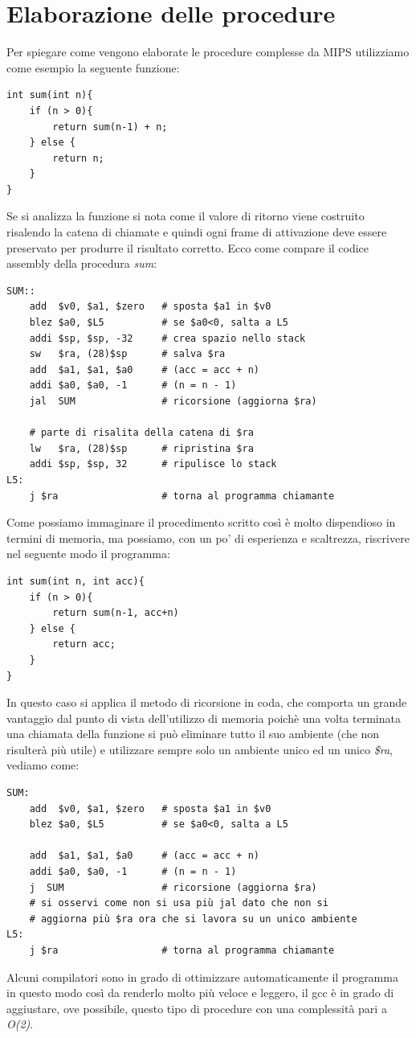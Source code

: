 \documentclass[class=book, crop=false]{standalone}
\begin{document}
\section{Elaborazione delle procedure}
Per spiegare come vengono elaborate le procedure complesse da MIPS utilizziamo come esempio la seguente funzione:

\begin{verbatim}
int sum(int n){
	if (n > 0){
		return sum(n-1) + n;
	} else {
		return n;
	}
}
\end{verbatim}

Se si analizza la funzione si nota come il valore di ritorno viene costruito risalendo la catena di chiamate e quindi ogni frame di attivazione deve essere preservato per produrre il risultato corretto. Ecco come compare il codice assembly della procedura \emph{sum}:

\begin{verbatim}
SUM::
	add  $v0, $a1, $zero   # sposta $a1 in $v0
	blez $a0, $L5          # se $a0<0, salta a L5
	addi $sp, $sp, -32     # crea spazio nello stack
	sw   $ra, (28)$sp      # salva $ra
	add  $a1, $a1, $a0     # (acc = acc + n)
	addi $a0, $a0, -1      # (n = n - 1)
	jal  SUM               # ricorsione (aggiorna $ra)

	# parte di risalita della catena di $ra
	lw   $ra, (28)$sp      # ripristina $ra
	addi $sp, $sp, 32      # ripulisce lo stack
L5:
	j $ra                  # torna al programma chiamante
\end{verbatim}

Come possiamo immaginare il procedimento scritto così è  molto dispendioso in termini di memoria, ma possiamo, con un po' di esperienza e scaltrezza, riscrivere nel seguente modo il programma:

\begin{verbatim}
int sum(int n, int acc){
	if (n > 0){
		return sum(n-1, acc+n)
	} else {
		return acc;
	}
}
\end{verbatim}

In questo caso si applica il metodo di ricorsione in coda, che comporta un grande vantaggio dal punto di vista dell'utilizzo di memoria poichè una volta terminata una chiamata della funzione si può eliminare tutto il suo ambiente (che non risulterà più utile) e utilizzare sempre solo un ambiente unico ed un unico \emph{\$ra}, vediamo come:

\begin{verbatim}
SUM:
	add  $v0, $a1, $zero   # sposta $a1 in $v0
	blez $a0, $L5          # se $a0<0, salta a L5

	add  $a1, $a1, $a0     # (acc = acc + n)
	addi $a0, $a0, -1      # (n = n - 1)
	j  SUM                 # ricorsione (aggiorna $ra)
	# si osservi come non si usa più jal dato che non si
	# aggiorna più $ra ora che si lavora su un unico ambiente
L5:
	j $ra                  # torna al programma chiamante
\end{verbatim}
Alcuni compilatori sono in grado di ottimizzare automaticamente il programma in questo modo così da renderlo molto più veloce e leggero, il gcc è in grado di aggiustare, ove possibile, questo tipo di procedure con una complessità pari a \emph{O(2)}.
\end{document}
